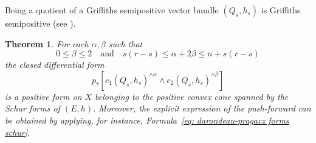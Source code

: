 \documentclass[a4paper]{amsart}
\theoremstyle{plain}%
\newtheorem{theorem}{Theorem}[section]
\theoremstyle{definition}
\theoremstyle{remark}
\begin{document}
Being a quotient of a Griffiths semipositive vector bundle $ (Q_s,h_s) $ is Griffiths semipositive (see \cite[{(6.10)}~Proposition]{Dem01}).

\begin{theorem}\label{thm: cone of positive forms}
	For each $ \alpha, \beta $ such that
	\begin{equation*}
		0 \le \beta \le 2 \quad \text{and} \quad s(r-s) \le \alpha + 2\beta \le n + s(r-s)
	\end{equation*}
	the closed differential form
	\begin{equation*}
		p_{*} \left[ {c_1(Q_s,h_s)}^{\wedge \alpha} \wedge {c_2(Q_s,h_s)}^{\wedge \beta} \right]
	\end{equation*}
	is a positive form on $ X $ belonging to the positive convex cone spanned by the Schur forms of $ (E,h) $.
	Moreover, the explicit expression of the push-forward can be obtained by applying, for instance, Formula~\eqref{eq: darondeau-pragacz forms schur}.
\end{theorem}
\end{document}
